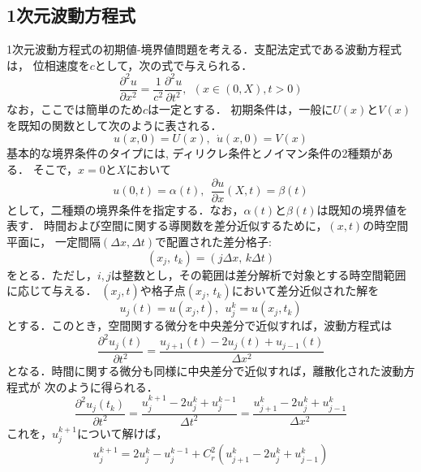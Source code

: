 \documentclass[10pt,a4j,dvipdfmx]{jarticle}
\begin{document}
\subsection{1次元波動方程式}
1次元波動方程式の初期値-境界値問題を考える．支配法定式である波動方程式は，
位相速度を$c$として，次の式で与えられる．
\begin{equation}
	\frac{\partial^2 u}{\partial x^2} =\frac{1}{c^2}\frac{\partial^2 u}{\partial t^2}, \ \ \left(x\in (0,X), t>0 \right)
	\label{eqn:wveq1d}
\end{equation}
なお，ここでは簡単のため$c$は一定とする．
初期条件は，一般に$U(x)$と$V(x)$を既知の関数として次のように表される．
\begin{equation}
	u(x,0)=U(x), \ \ \dot{u}(x,0)=V(x)
	\label{eqn:}
\end{equation}
基本的な境界条件のタイプには, ディリクレ条件とノイマン条件の2種類がある．
そこで，$x=0$と$X$において
\begin{equation}
	u(0,t)=\alpha(t), \ \ \frac{\partial u}{\partial x}(X,t)=\beta(t)
	\label{eqn:}
\end{equation}
として，二種類の境界条件を指定する．なお，$\alpha(t)$と$\beta(t)$は既知の境界値を表す．
時間および空間に関する導関数を差分近似するために，$(x,t)$の時空間平面に，
一定間隔$(\Delta x, \Delta t)$で配置された差分格子:
\begin{equation}
	(x_j,\, t_k)=(j\Delta x,\, k\Delta t)
	\label{eqn:}
\end{equation}
をとる．ただし，$i,j$は整数とし，その範囲は差分解析で対象とする時空間範囲に応じて与える．
$(x_j,t)$や格子点$(x_j,\,t_k)$において差分近似された解を
\begin{equation}
	u_j(t)=u(x_j,t), \ \ u^k_j=u(x_j,t_k)
	\label{eqn:}
\end{equation}
とする．このとき，空間関する微分を中央差分で近似すれば，波動方程式は
\begin{equation}
	\frac{\partial^2 u_j(t)}{\partial t^2}
	=\frac{u_{j+1}(t)-2u_j(t)+u_{j-1}(t)}{\Delta x^2}
	\label{eqn:}
\end{equation}
となる．時間に関する微分も同様に中央差分で近似すれば，離散化された波動方程式が
次のように得られる．
\begin{equation}
	\frac{\partial^2 u_j(t_k)}{\partial t^2}
	=\frac{u_{j}^{k+1}-2u^k_j+u^{k-1}_j}{\Delta t^2}
	=\frac{u_{j+1}^k-2u_j^k+u_{j-1}^k}{\Delta x^2}
	\label{eqn:}
\end{equation}
これを，$u^{k+1}_j$について解けば，
\begin{equation}
	u^{k+1}_j = 2u^k_j- u^{k-1}_j
	+C_r^2 \left( 
		u_{j+1}^k-2u_j^k +u_{j-1}^k
	\right) 
	\label{eqn:fd2nd}
\end{equation}
\end{document}
